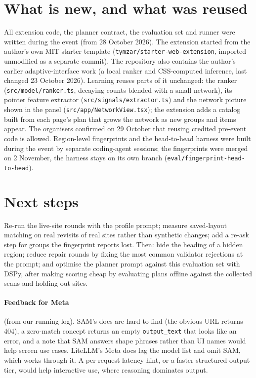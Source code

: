 \documentclass[10pt,a4paper]{article}
\begin{document}
\section{What is new, and what was reused}
All extension code, the planner contract, the evaluation set and runner were written during the event (from 28 October 2026). The extension started from the author's own MIT starter template (\texttt{tymzar/\allowbreak starter-web-extension}, imported unmodified as a separate commit). The repository also contains the author's earlier adaptive-interface work (a local ranker and CSS-computed inference, last changed 23 October 2026). Learning reuses parts of it unchanged: the ranker (\texttt{src/model/ranker.ts}, decaying counts blended with a small network), its pointer feature extractor (\texttt{src/signals/extractor.ts}) and the network picture shown in the panel (\texttt{src/app/NetworkView.tsx}); the extension adds a catalog built from each page's plan that grows the network as new groups and items appear. The organisers confirmed on 29 October that reusing credited pre-event code is allowed. Region-level fingerprints and the head-to-head harness were built during the event by separate coding-agent sessions; the fingerprints were merged on 2 November, the harness stays on its own branch (\texttt{eval/fingerprint-head-to-head}).

\section{Next steps}
Re-run the live-site rounds with the profile prompt; measure saved-layout matching on real revisits of real sites rather than synthetic changes; add a re-ask step for groups the fingerprint reports lost. Then: hide the heading of a hidden region; reduce repair rounds by fixing the most common validator rejections at the prompt; and optimise the planner prompt against this evaluation set with DSPy, after making scoring cheap by evaluating plans offline against the collected scans and holding out sites.

\paragraph{Feedback for Meta} (from our running log). SAM's docs are hard to find (the obvious URL returns 404), a zero-match concept returns an empty \texttt{output\_text} that looks like an error, and a note that SAM answers shape phrases rather than UI names would help screen use cases. LiteLLM's Meta docs lag the model list and omit SAM, which works through it. A per-request latency hint, or a faster structured-output tier, would help interactive use, where reasoning dominates output.
\end{document}
